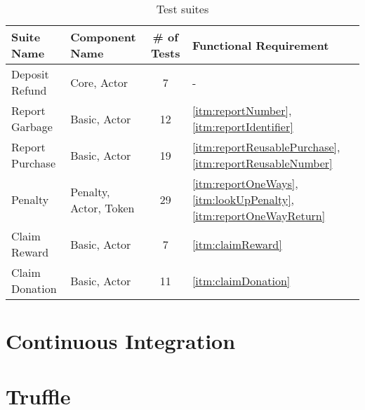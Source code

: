 
\begin{table}[hbt]
	\centering
  	\begin{tabular}{l|l|c|l}
	    Suite Name & Component Name & \# of Tests & Functional Requirement \\
	    \hline
	    Deposit Refund & Core, Actor & 7 & - \\
	    Report Garbage & Basic, Actor & 12 & \ref{itm:reportNumber}, \ref{itm:reportIdentifier} \\
	    Report Purchase & Basic, Actor & 19 & \ref{itm:reportReusablePurchase}, \ref{itm:reportReusableNumber} \\
		Penalty & Penalty, Actor, Token & 29 & \ref{itm:reportOneWays}, \ref{itm:lookUpPenalty}, \ref{itm:reportOneWayReturn} \\ 
		Claim Reward & Basic, Actor & 7 & \ref{itm:claimReward} \\
		Claim Donation & Basic, Actor & 11 & \ref{itm:claimDonation} \\
  	\end{tabular}
  	\caption{Test suites}
  	\label{tab:testSuites}
\end{table}

\FloatBarrier

\section{Continuous Integration}

\section{Truffle}


